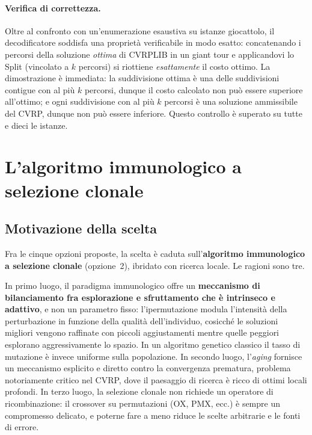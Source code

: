 \documentclass[10pt,a4paper]{article}
\begin{document}
\paragraph{Verifica di correttezza.} Oltre al confronto con un'enumerazione
esaustiva su istanze giocattolo, il decodificatore soddisfa una proprietà
verificabile in modo esatto: concatenando i percorsi della soluzione
\emph{ottima} di CVRPLIB in un giant tour e applicandovi lo Split (vincolato a
$k$ percorsi) si riottiene \emph{esattamente} il costo ottimo. La dimostrazione è
immediata: la suddivisione ottima è una delle suddivisioni contigue con al più
$k$ percorsi, dunque il costo calcolato non può essere superiore all'ottimo; e
ogni suddivisione con al più $k$ percorsi è una soluzione ammissibile del CVRP,
dunque non può essere inferiore. Questo controllo è superato su tutte e dieci le
istanze.

\section{L'algoritmo immunologico a selezione clonale}
\label{sec:immune}

\subsection{Motivazione della scelta}

Fra le cinque opzioni proposte, la scelta è caduta sull'\textbf{algoritmo
immunologico a selezione clonale} (opzione~2), ibridato con ricerca locale. Le
ragioni sono tre.

In primo luogo, il paradigma immunologico offre un \textbf{meccanismo di
bilanciamento fra esplorazione e sfruttamento che è intrinseco e adattivo}, e non
un parametro fisso: l'ipermutazione modula l'intensità della perturbazione in
funzione della qualità dell'individuo, cosicché le soluzioni migliori vengono
raffinate con piccoli aggiustamenti mentre quelle peggiori esplorano
aggressivamente lo spazio. In un algoritmo genetico classico il tasso di
mutazione è invece uniforme sulla popolazione. In secondo luogo, l'\emph{aging}
fornisce un meccanismo esplicito e diretto contro la convergenza prematura,
problema notoriamente critico nel CVRP, dove il paesaggio di ricerca è ricco di
ottimi locali profondi. In terzo luogo, la selezione clonale non richiede un
operatore di ricombinazione: il crossover su permutazioni (OX, PMX, ecc.) è
sempre un compromesso delicato, e poterne fare a meno riduce le scelte arbitrarie
e le fonti di errore.
\end{document}
